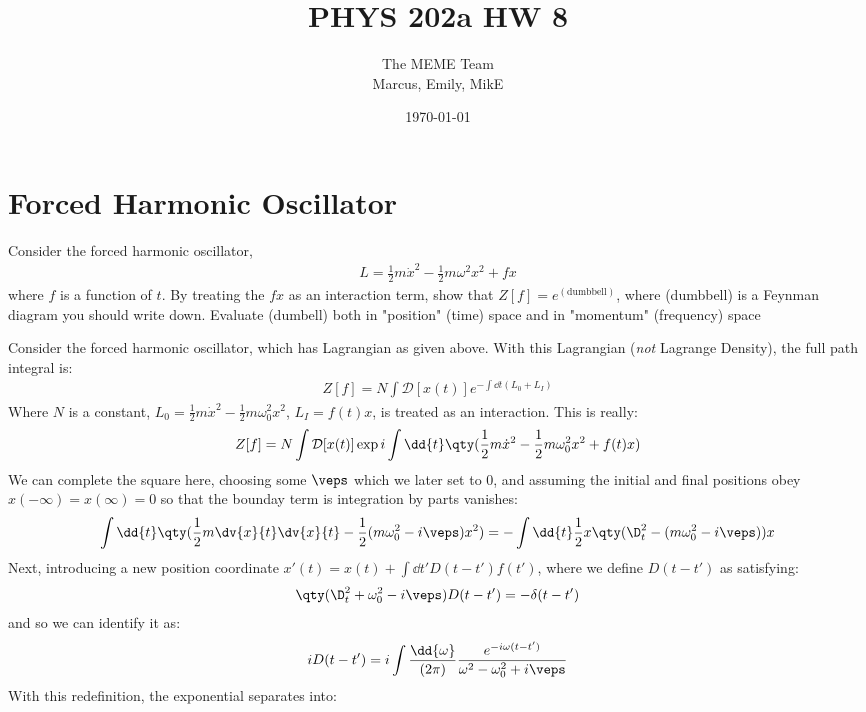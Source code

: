 \documentclass[12pt]{article}
\title{\vspace{-3em}PHYS 202a HW 8}
\author{The MEME Team \\ Marcus, Emily, MikE}
\date{\today}
\begin{document}
\maketitle
\section{Forced Harmonic Oscillator}
\begin{problem}
  Consider the forced harmonic oscillator,
  \begin{align*}
    L=\frac12m\dot{x}^2-\frac12m\omega^2x^2+f x
  \end{align*}
  where $f$ is a function of $t$. By treating the $fx$ as an interaction term, show that $Z[f]=e^{(\text{dumbbell})}$, where (dumbbell) is a Feynman diagram you should write down. Evaluate (dumbell) both in "position" (time) space and in "momentum" (frequency) space
\end{problem}
Consider the forced harmonic oscillator, which has Lagrangian as given above. With this Lagrangian (\emph{not} Lagrange Density), the full path integral is:
\begin{align*}
  Z[f]=N\int\mathcal{D}[x(t)]e^{-\int\dd{t}(L_0+L_I)}
\end{align*}
Where $N$ is a constant, $L_0=\frac12m\dot{x}^2-\frac12m\omega_0^2x^2$, $L_I=f(t)x$, is treated as an interaction. This is really:
\begin{align*}
  Z[f]=N\int\mathcal{D}[x(t)]\exp{i\int\dd{t}\qty(\frac12m\dot{x}^2-\frac12m\omega_0^2x^2+f(t)x)}
\end{align*}
We can complete the square here, choosing some $\veps$ which we later set to $0$, and assuming the initial and final positions obey $x(-\infty)=x(\infty)=0$ so that the bounday term is integration by parts vanishes:
\begin{align*}
  \int\dd{t}\qty(\frac12m\dv{x}{t}\dv{x}{t}-\frac12(m\omega_0^2-i\veps)x^2)
  =-\int\dd{t}\frac12x\qty(\D_t^2-(m\omega_0^2-i\veps))x
\end{align*}
Next, introducing a new position coordinate $x'(t)=x(t)+\int\dd{t'}D(t-t')f(t')$, where we define $D(t-t')$ as satisfying:
\begin{align*}
  \qty(\D_t^2+\omega_0^2-i\veps)D(t-t')=-\delta(t-t')
\end{align*}
and so we can identify it as:
\begin{align*}
  iD(t-t')=i\int\frac{\dd{\omega}}{(2\pi)}\frac{e^{-i\omega(t-t')}}{\omega^2-\omega_0^2+i\veps}
\end{align*}
With this redefinition, the exponential separates into:
\end{document}
